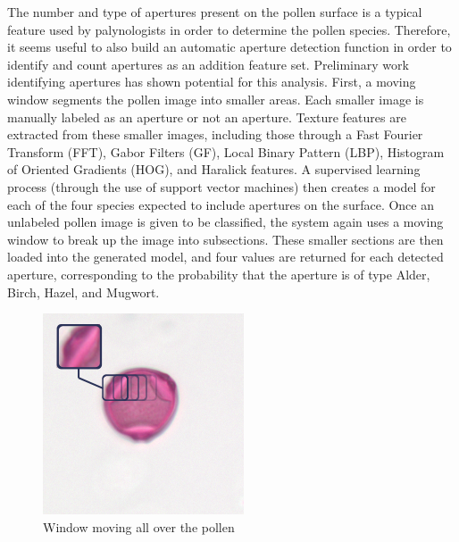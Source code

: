 \documentclass[runningheads,a4paper]{llncs}
\begin{document}
The number and type of apertures present on the pollen surface is a typical feature used by palynologists in order to determine the pollen species. Therefore, it seems useful to also build an automatic aperture detection function in order to identify and count apertures as an addition feature set. Preliminary work identifying apertures \cite{Lozano_2013_ICIAP} has shown potential for this analysis.
First, a moving window segments the pollen image into smaller areas. Each smaller image is manually labeled as an aperture or not an aperture. Texture features are extracted from these smaller images, including those through a Fast Fourier Transform (FFT), Gabor Filters (GF), Local Binary Pattern (LBP), Histogram of Oriented Gradients (HOG), and Haralick features. A supervised learning process (through the use of support vector machines) then creates a model for each of the four species expected to include apertures on the surface.
Once an unlabeled pollen image is given to be classified, the system again uses a moving window to break up the image into subsections. These smaller sections are then loaded into the generated model, and four values are returned for each detected aperture, corresponding to the probability that the aperture is of type Alder, Birch, Hazel, and Mugwort. 

    
    
  
  
  
  
  
  
  

\begin{figure}[h!]
\begin{center}
\includegraphics[width=0.7\columnwidth]{figures/birchMod/birchMod.png}
\caption{\label{fig:aperture_window}
Window moving all over the pollen%
}
\end{center}
\end{figure}
\end{document}

